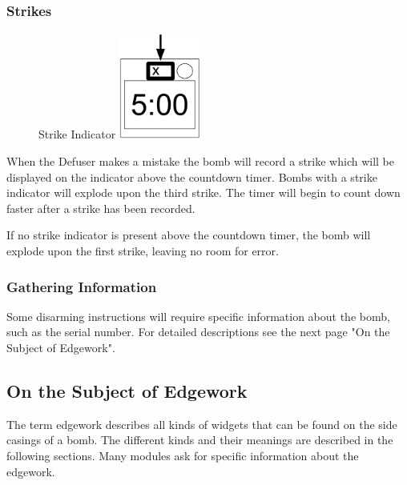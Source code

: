 \documentclass{../../ktane-mod}
\begin{document}
\subsubsection*{Strikes}
\begin{figure} %
  \vspace{-2\baselineskip}
  Strike Indicator
  \centering
  \includegraphics[height=3.5cm]{images/strike}
  \label{fig:Strikes}
\end{figure}
When the Defuser makes a mistake the bomb will record a strike which will be displayed on the indicator above the countdown timer.
Bombs with a strike indicator will explode upon the third strike.
The timer will begin to count down faster after a strike has been recorded.

If no strike indicator is present above the countdown timer, the bomb will explode upon the first strike, leaving no room for error.

\subsubsection*{Gathering Information}
Some disarming instructions will require specific information about the bomb, such as the serial number.
For detailed descriptions see the next page "On the Subject of Edgework".

\clearpage

\subsection*{On the Subject of Edgework}
The term edgework describes all kinds of widgets that can be found on the side casings of a bomb.
The different kinds and their meanings are described in the following sections.
Many modules ask for specific information about the edgework.
\end{document}

